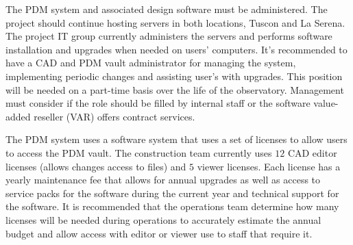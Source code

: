 The PDM system and associated design software must be administered.
The project should continue hosting servers in both locations, Tuscon and La Serena.
The project IT group currently administers the servers and performs software installation and upgrades when needed on users' computers.
It's recommended to have a CAD and PDM vault administrator for managing the system, implementing periodic changes and assisting user's with upgrades.
This position will be needed on a part-time basis over the life of the observatory.
Management must consider if the role should be filled by internal staff or the software value-added reseller (VAR) offers contract services.

The PDM system uses a software system that uses a set of licenses to allow users to access the PDM vault.
The construction team currently uses $12$ CAD editor licenses (allows changes access to files) and $5$ viewer licenses.
Each license has a yearly maintenance fee that allows for annual upgrades as well as access to service packs for the software during the current year and technical support for the software.
It is recommended that the operations team determine how many licenses will be needed during operations to accurately estimate the annual budget and allow access with editor or viewer use to staff that require it.
